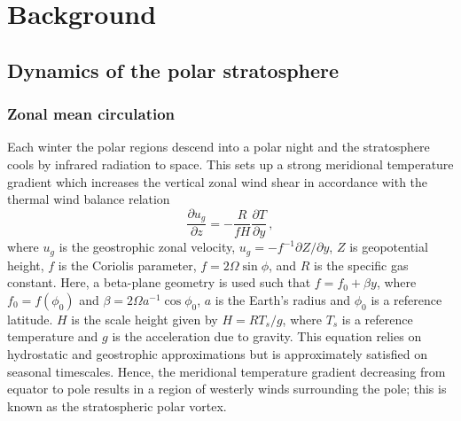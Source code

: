 \chapter{Background}
\label{cha:background}


\section{Dynamics of the polar stratosphere}
\label{sec:dynam-polar-strat}


\subsection{Zonal mean circulation}

Each winter the polar regions descend into a polar night and the stratosphere
cools by infrared radiation to space. This sets up a strong meridional
temperature gradient which increases the vertical zonal wind shear in accordance
with the thermal wind balance relation
\begin{equation}
\frac{\partial u_g}{\partial z} = -\frac{R}{fH}\frac{\partial T}{\partial y} \,, 
\end{equation} 
where $u_g$ is the geostrophic zonal velocity,
$u_g = -f^{-1}\partial Z/\partial y$, $Z$ is geopotential height, $f$ is the
Coriolis parameter, $f=2\Omega\sin\phi$, and $R$ is the specific gas
constant. Here, a beta-plane geometry is used such that $f=f_0+\beta y$, where
$f_0=f(\phi_0)$ and $\beta = 2\Omega a^{-1}\cos\phi_0$, $a$ is the Earth's
radius and $\phi_{0}$ is a reference latitude. $H$ is the scale height given by
$H = RT_s/g$, where $T_s$ is a reference temperature and $g$ is the acceleration
due to gravity. This equation relies on hydrostatic and geostrophic
approximations but is approximately satisfied on seasonal timescales. Hence, the
meridional temperature gradient decreasing from equator to pole results in a
region of westerly winds surrounding the pole; this is known as the
stratospheric polar vortex.

